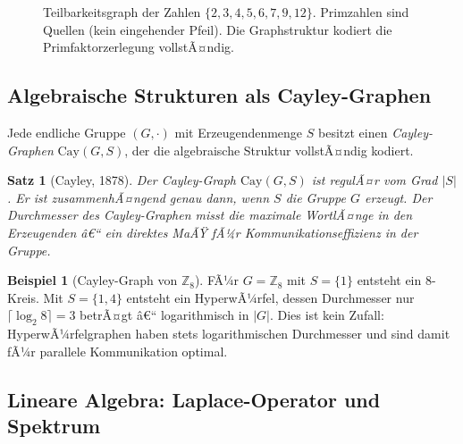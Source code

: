 ﻿\documentclass[12pt,a4paper,twoside]{article}
\theoremstyle{definition}
\newtheorem{beispiel}{Beispiel}[section]
\theoremstyle{plain}
\newtheorem{theorem}{Satz}[section]
\theoremstyle{remark}
\begin{document}
\begin{figure}[h]
  \centering
  \caption{Teilbarkeitsgraph der Zahlen $\{2,3,4,5,6,7,9,12\}$.
           Primzahlen sind Quellen (kein eingehender Pfeil).
           Die Graphstruktur kodiert die Primfaktorzerlegung
           vollstÃ¤ndig.}
  \label{fig:divisibility}
\end{figure}

\subsection{Algebraische Strukturen als Cayley-Graphen}

Jede endliche Gruppe $(G, \cdot)$ mit Erzeugendenmenge $S$ besitzt
einen \emph{Cayley-Graphen} $\text{Cay}(G,S)$, der die algebraische
Struktur vollstÃ¤ndig kodiert.

\begin{theorem}[Cayley, 1878]
Der Cayley-Graph $\text{Cay}(G,S)$ ist regulÃ¤r vom Grad $|S|$.  Er
ist zusammenhÃ¤ngend genau dann, wenn $S$ die Gruppe $G$ erzeugt.
Der Durchmesser des Cayley-Graphen misst die maximale WortlÃ¤nge
in den Erzeugenden â€“ ein direktes MaÃŸ fÃ¼r
Kommunikationseffizienz in der Gruppe.
\end{theorem}

\begin{beispiel}[Cayley-Graph von $\mathbb{Z}_8$]
FÃ¼r $G = \mathbb{Z}_8$ mit $S=\{1\}$ entsteht ein 8-Kreis.
Mit $S=\{1,4\}$ entsteht ein HyperwÃ¼rfel, dessen Durchmesser
nur $\lceil\log_2 8\rceil = 3$ betrÃ¤gt â€“ logarithmisch in $|G|$.
Dies ist kein Zufall: HyperwÃ¼rfelgraphen haben stets logarithmischen
Durchmesser und sind damit fÃ¼r parallele Kommunikation optimal.
\end{beispiel}

\subsection{Lineare Algebra: Laplace-Operator und Spektrum}
\end{document}

